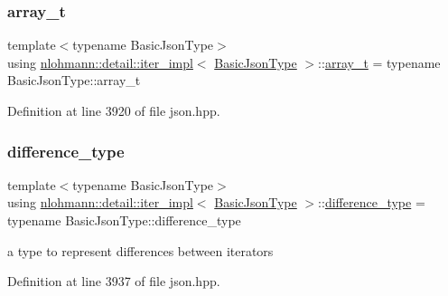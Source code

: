 \subsubsection{\texorpdfstring{array\+\_\+t}{array\_t}}
{\footnotesize\ttfamily template$<$typename Basic\+Json\+Type$>$ \\
using \hyperlink{classnlohmann_1_1detail_1_1iter__impl}{nlohmann\+::detail\+::iter\+\_\+impl}$<$ \hyperlink{classnlohmann_1_1detail_1_1iter__impl_abf18f18793f84b0222aebb5a2a87da7a}{Basic\+Json\+Type} $>$\+::\hyperlink{classnlohmann_1_1detail_1_1iter__impl_aef02cf75b1cb199286fd2f666c60e38e}{array\+\_\+t} =  typename Basic\+Json\+Type\+::array\+\_\+t\hspace{0.3cm}{\ttfamily [private]}}



Definition at line 3920 of file json.\+hpp.

\mbox{\label{classnlohmann_1_1detail_1_1iter__impl_a2f7ea9f7022850809c60fc3263775840}} 
\subsubsection{\texorpdfstring{difference\+\_\+type}{difference\_type}}
{\footnotesize\ttfamily template$<$typename Basic\+Json\+Type$>$ \\
using \hyperlink{classnlohmann_1_1detail_1_1iter__impl}{nlohmann\+::detail\+::iter\+\_\+impl}$<$ \hyperlink{classnlohmann_1_1detail_1_1iter__impl_abf18f18793f84b0222aebb5a2a87da7a}{Basic\+Json\+Type} $>$\+::\hyperlink{classnlohmann_1_1detail_1_1iter__impl_a2f7ea9f7022850809c60fc3263775840}{difference\+\_\+type} =  typename Basic\+Json\+Type\+::difference\+\_\+type}



a type to represent differences between iterators 



Definition at line 3937 of file json.\+hpp.

\mbox{\label{classnlohmann_1_1detail_1_1iter__impl_ad9e091f5c70b34b5b1abc1ab15fd9106}} 
